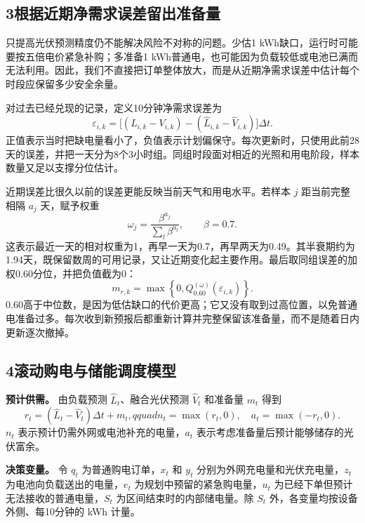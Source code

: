 \subsection*{3\quad 根据近期净需求误差留出准备量}

只提高光伏预测精度仍不能解决风险不对称的问题。少估1 kWh缺口，运行时可能要按五倍电价紧急补购；多准备1 kWh普通电，也可能因为负载较低或电池已满而无法利用。因此，我们不直接把订单整体放大，而是从近期净需求误差中估计每个时段应保留多少安全余量。

对过去已经兑现的记录，定义10分钟净需求误差为
\begin{equation}
\varepsilon_{i,k}=
\big[(L_{i,k}-V_{i,k})-(\widehat L_{i,k}-\widehat V_{i,k})\big]\Delta t.
\label{eq:q3-error}
\end{equation}
正值表示当时把缺电量看小了，负值表示计划偏保守。每次更新时，只使用此前28天的误差，并把一天分为8个3小时组。同组时段面对相近的光照和用电阶段，样本数量又足以支撑分位估计。

近期误差比很久以前的误差更能反映当前天气和用电水平。若样本 $j$ 距当前完整相隔 $a_j$ 天，赋予权重
\begin{equation}
\omega_j=\frac{\beta^{a_j}}{\sum_l\beta^{a_l}},\qquad \beta=0.7.
\label{eq:q3-decay}
\end{equation}
这表示最近一天的相对权重为1，再早一天为0.7，再早两天为0.49。其半衰期约为1.94天，既保留数周的可用记录，又让近期变化起主要作用。最后取同组误差的加权0.60分位，并把负值截为0：
\begin{equation}
m_{r,k}=\max\left\{0,Q_{0.60}^{(\omega)}(\varepsilon_{i,k})\right\}.
\label{eq:q3-margin}
\end{equation}
0.60高于中位数，是因为低估缺口的代价更高；它又没有取到过高位置，以免普通电准备过多。每次收到新预报后都重新计算并完整保留该准备量，而不是随着日内更新逐次撤掉。

\subsection*{4\quad 滚动购电与储能调度模型}

\textbf{预计供需。} 由负载预测 $\widehat L_t$、融合光伏预测 $\widehat V_t$ 和准备量 $m_t$ 得到
\begin{equation}
r_t=(\widehat L_t-\widehat V_t)\Delta t+m_t,qquad
n_t=\max(r_t,0),\quad a_t=\max(-r_t,0).
\label{eq:q3-net}
\end{equation}
$n_t$ 表示预计仍需外网或电池补充的电量，$a_t$ 表示考虑准备量后预计能够储存的光伏富余。

\textbf{决策变量。} 令 $q_t$ 为普通购电订单，$x_t$ 和 $y_t$ 分别为外网充电量和光伏充电量，$z_t$ 为电池向负载送出的电量，$e_t$ 为规划中预留的紧急购电量，$u_t$ 为已经下单但预计无法接收的普通电量，$S_t$ 为区间结束时的内部储电量。除 $S_t$ 外，各变量均按设备外侧、每10分钟的 kWh 计量。

